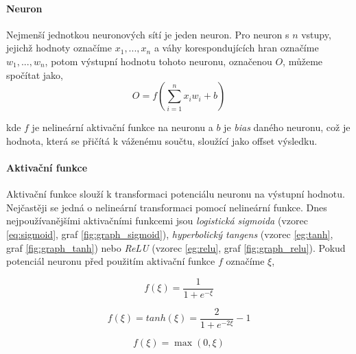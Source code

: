 \paragraph{Neuron}
Nejmenší jednotkou neuronových sítí je jeden neuron. Pro neuron s $n$ vstupy,
jejichž hodnoty označíme $x_1,...,x_n$ a váhy korespondujících hran označíme\\
$w_1,...,w_n$, potom výstupní hodnotu tohoto neuronu, označenou $O$,
můžeme spočítat jako,
\begin{equation}
    O = f(\sum_{i=1}^{n} x_iw_i + b)
\end{equation}

kde $f$ je nelineární aktivační funkce na neuronu a $b$ je \emph{bias} daného
neuronu, což je hodnota, která se přičítá k váženému součtu, sloužící jako
offset výsledku.

\paragraph{Aktivační funkce}
Aktivační funkce slouží k transformaci potenciálu neuronu na výstupní hodnotu.
Nejčastěji se jedná o nelineární transformaci pomocí nelineární funkce. Dnes
nejpoužívanějšími aktivačními funkcemi jsou \emph{logistická sigmoida} (vzorec
\ref{eq:sigmoid}, graf \ref{fig:graph_sigmoid}), \emph{hyperbolický tangens}
(vzorec \ref{eg:tanh}, graf \ref{fig:graph_tanh}) nebo \emph{ReLU} (vzorec
\ref{eg:relu}, graf \ref{fig:graph_relu}). Pokud potenciál neuronu před
použitím aktivační funkce $f$ označíme $\xi$,


\begin{equation} \label{eq:sigmoid}
    f(\xi) = \frac{1}{1+e^{-\xi}}
\end{equation}

\begin{equation} \label{eg:tanh}
    f(\xi) = tanh(\xi) = \frac{2}{1+e^{-2\xi}} - 1
\end{equation}

\begin{equation} \label{eg:relu}
    f(\xi) = \max(0, \xi)
\end{equation}

